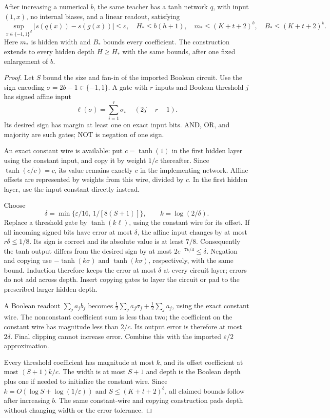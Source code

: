 \begin{lemma}
\label{lem:tanh-Boolean-compiler}
After increasing a numerical $b$, the same teacher has a tanh network $q$, with input $(1,x)$, no internal biases, and a linear readout, satisfying
\[
 \sup_{x\in\{-1,1\}^d}|s(q(x))-s(g(x))|\le\varepsilon,
 \quad H_*\le b(h+1),\quad
 m_*\le(K+t+2)^b,\quad
 B_*\le(K+t+2)^b.
\]
Here $m_*$ is hidden width and $B_*$ bounds every coefficient. The construction extends to every hidden depth $H\ge H_*$ with the same bounds, after one fixed enlargement of $b$.
\end{lemma}
\begin{proof}
Let $S$ bound the size and fan-in of the imported Boolean circuit. Use the sign encoding $\sigma=2b-1\in\{-1,1\}$. A gate with $r$ inputs and Boolean threshold $j$ has signed affine input
\[
 \ell(\sigma)=\sum_{i=1}^r\sigma_i-(2j-r-1).
\]
Its desired sign has margin at least one on exact input bits. AND, OR, and majority are such gates; NOT is negation of one sign.

An exact constant wire is available: put $c=\tanh(1)$ in the first hidden layer using the constant input, and copy it by weight $1/c$ thereafter. Since $\tanh(c/c)=c$, its value remains exactly $c$ in the implementing network. Affine offsets are represented by weights from this wire, divided by $c$. In the first hidden layer, use the input constant directly instead.

Choose
\[
 \delta=\min\{\varepsilon/16,\,1/[8(S+1)]\},\qquad
 k=\log(2/\delta).
\]
Replace a threshold gate by $\tanh(k\ell)$, using the constant wire for its offset. If all incoming signed bits have error at most $\delta$, the affine input changes by at most $r\delta\le1/8$. Its sign is correct and its absolute value is at least $7/8$. Consequently the tanh output differs from the desired sign by at most $2e^{-7k/4}\le\delta$. Negation and copying use $-\tanh(k\sigma)$ and $\tanh(k\sigma)$, respectively, with the same bound. Induction therefore keeps the error at most $\delta$ at every circuit layer; errors do not add across depth. Insert copying gates to layer the circuit or pad to the prescribed larger hidden depth.

A Boolean readout $\sum_j a_jb_j$ becomes
$\tfrac12\sum_j a_j\sigma_j+\tfrac12\sum_j a_j$, using the exact constant wire. The nonconstant coefficient sum is less than two; the coefficient on the constant wire has magnitude less than $2/c$. Its output error is therefore at most $2\delta$. Final clipping cannot increase error. Combine this with the imported $\varepsilon/2$ approximation.

Every threshold coefficient has magnitude at most $k$, and its offset coefficient at most $(S+1)k/c$. The width is at most $S+1$ and depth is the Boolean depth plus one if needed to initialize the constant wire. Since $k=O(\log S+\log(1/\varepsilon))$ and $S\le(K+t+2)^b$, all claimed bounds follow after increasing $b$. The same constant-wire and copying construction pads depth without changing width or the error tolerance.
\end{proof}

